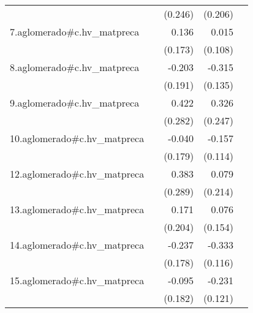 {\begin{longtable}{l*{4}{D{.}{.}{-1}}}
            &                     &     (0.246)         &     (0.206)         &                     \\
\addlinespace
7.aglomerado#c.hv\_matpreca&                     &       0.136         &       0.015         &                     \\
            &                     &     (0.173)         &     (0.108)         &                     \\
\addlinespace
8.aglomerado#c.hv\_matpreca&                     &      -0.203         &      -0.315\sym{*}  &                     \\
            &                     &     (0.191)         &     (0.135)         &                     \\
\addlinespace
9.aglomerado#c.hv\_matpreca&                     &       0.422         &       0.326         &                     \\
            &                     &     (0.282)         &     (0.247)         &                     \\
\addlinespace
10.aglomerado#c.hv\_matpreca&                     &      -0.040         &      -0.157         &                     \\
            &                     &     (0.179)         &     (0.114)         &                     \\
\addlinespace
12.aglomerado#c.hv\_matpreca&                     &       0.383         &       0.079         &                     \\
            &                     &     (0.289)         &     (0.214)         &                     \\
\addlinespace
13.aglomerado#c.hv\_matpreca&                     &       0.171         &       0.076         &                     \\
            &                     &     (0.204)         &     (0.154)         &                     \\
\addlinespace
14.aglomerado#c.hv\_matpreca&                     &      -0.237         &      -0.333\sym{**} &                     \\
            &                     &     (0.178)         &     (0.116)         &                     \\
\addlinespace
15.aglomerado#c.hv\_matpreca&                     &      -0.095         &      -0.231         &                     \\
            &                     &     (0.182)         &     (0.121)         &                     \\

\end{longtable}}
